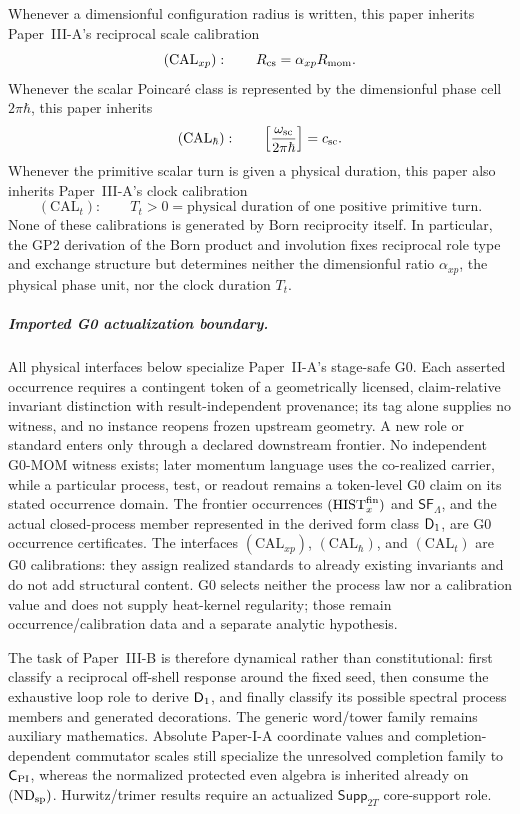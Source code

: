\documentclass[12pt,a4paper]{article}
\begin{document}
Whenever a dimensionful configuration radius is written, this paper inherits
Paper~III-A's reciprocal scale calibration
\[
 (\mathrm{CAL}_{xp}):\qquad R_{\mathrm{cs}}=\alpha_{xp}R_{\mathrm{mom}}.
\]
Whenever the scalar Poincar\'e class is represented by the dimensionful phase
cell \(2\pi\hbar\), this paper inherits
\[
 (\mathrm{CAL}_{\hbar}):\qquad
 \left[\frac{\omega_{\rm sc}}{2\pi\hbar}\right]=c_{\rm sc}.
\]
Whenever the primitive scalar turn is given a physical duration, this paper
also inherits Paper~III-A's clock calibration
\[
 (\mathrm{CAL}_{t}):\qquad
 T_t>0
 =\text{physical duration of one positive primitive turn}.
\]
None of these calibrations is generated by Born reciprocity itself.  In
particular, the GP2 derivation of the Born product and involution fixes
reciprocal role type and exchange structure but determines neither the
dimensionful ratio \(\alpha_{xp}\), the physical phase unit, nor the clock
duration \(T_t\).

\subparagraph{Imported G0 actualization boundary.}
All physical interfaces below specialize Paper~II-A's stage-safe G0.  Each
asserted occurrence requires a contingent token of a geometrically licensed,
claim-relative invariant distinction with result-independent provenance; its
tag alone supplies no witness, and no instance reopens frozen upstream
geometry.  A new role or standard enters only through a declared downstream
frontier.  No independent G0-MOM witness exists; later momentum language uses
the co-realized carrier, while a particular process, test, or readout remains
a token-level G0 claim on its stated occurrence domain.
The frontier occurrences \((\mathrm{HIST}_x^{\rm fin})\) and
\(\mathsf{SF}_\Lambda\), and the
actual closed-process member represented in the derived form class \(\mathsf{D}_1\), are G0
occurrence certificates.  The interfaces \((\mathrm{CAL}_{xp})\),
\((\mathrm{CAL}_{\hbar})\), and \((\mathrm{CAL}_{t})\) are G0
calibrations: they assign realized standards to already existing invariants
and do not add structural content.  G0 selects neither the process law nor a
calibration value and does not supply heat-kernel regularity; those remain
occurrence/calibration data and a separate analytic hypothesis.

The task of Paper~III-B is therefore dynamical rather than constitutional:
first classify a reciprocal off-shell response around the fixed seed, then
consume the exhaustive loop role to derive \(\mathsf{D}_1\), and finally classify its
possible spectral process members and generated decorations.  The generic word/tower family remains auxiliary mathematics.  Absolute
Paper-I-A coordinate values and completion-dependent commutator scales still
specialize the unresolved completion family to \(\mathsf C_{\rm PI}\),
whereas the normalized protected even algebra is inherited already on
\((\mathrm{ND}_{\rm sp})\).  Hurwitz/trimer results require an actualized
\(\mathsf{Supp}_{2T}\) core-support role.
\end{document}
